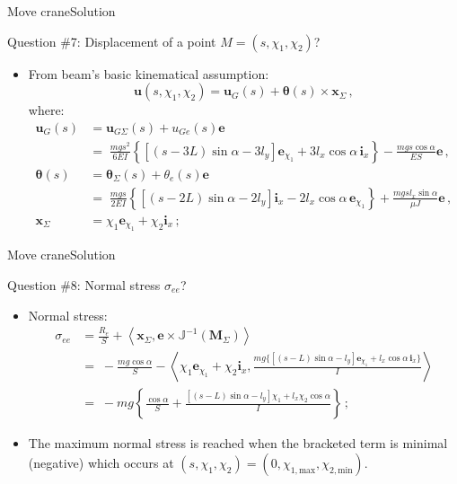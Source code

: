 \documentclass{beamer}
\newcommand{\uj}{u}
\newcommand{\xj}{x}
\newcommand{\yj}{y}
\newcommand{\uv}{{\boldsymbol\uj}}
\newcommand{\xv}{{\boldsymbol\xj}}
\newcommand{\ej}{e}
\renewcommand{\ij}{i}
\newcommand{\ev}{{\boldsymbol\ej}}
\newcommand{\iv}{{\boldsymbol\ij}}
\newcommand*{\xiu}{\chi_1}
\newcommand*{\xid}{\chi_2}
\newcommand*{\drotj}{\theta}
\newcommand*{\drot}{{\boldsymbol\drotj}}
\newcommand*{\Mstaticj}{J}
\newcommand*{\Mstatic}{{\mathbb\Mstaticj}}
\newcommand*{\stressj}{\sigma}
\newcommand{\Fresj}{R}
\newcommand{\Mresj}{M}
\newcommand{\Mres}{{\boldsymbol\Mresj}}
\newcommand{\scal}[1]{\left\langle{#1}\right\rangle}
\begin{document}
\begin{frame}{Move crane}{Solution}

\begin{exampleblock}{Question \#7: Displacement of a point $M=(s,\xiu,\xid)$?}
\begin{itemize}
\item From beam's basic kinematical assumption:
\begin{displaymath}
\uv(s,\xiu,\xid)=\uv_G(s)+\drot(s)\times\xv_\Sigma\,,
\end{displaymath}
where:
\begin{displaymath}
\begin{split}
\uv_G(s) &=\uv_{G\Sigma}(s)+\uj_{Ge}(s)\ev \\
&=\;\scriptstyle \frac{mgs^2}{6EI}\left\{\left[\left(s-3L\right)\sin\alpha-3l_\yj\right]\ev_{\xiu}+3l_\xj\cos\alpha\,\iv_\xj\right\} - \frac{mgs\cos\alpha}{ES}\ev \,, \\
\drot(s) &=\drot_\Sigma(s)+\drotj_e(s)\ev \\
&=\;\scriptstyle \frac{mgs}{2EI}\left\{\left[\left(s-2L\right)\sin\alpha-2l_\yj\right]\iv_\xj-2l_\xj\cos\alpha\,\ev_{\xiu}\right\} + \frac{mgsl_\xj\sin\alpha}{\mu J}\ev\,, \\
\xv_\Sigma &=\xiu\ev_{\xiu}+\xid\iv_\xj\,;
\end{split}
\end{displaymath}
\end{itemize}
\end{exampleblock}

\end{frame}

\begin{frame}{Move crane}{Solution}

\begin{exampleblock}{Question \#8: Normal stress $\stressj_{ee}$?}
\begin{itemize}
\item Normal stress:
\begin{displaymath}
\begin{split}
\stressj_{ee} &=\frac{\Fresj_e}{S}+\scal{\xv_\Sigma,\ev\times\Mstatic^{-1}(\Mres_\Sigma)} \\
&=\;\scriptstyle -\frac{mg\cos\alpha}{S}-\scal{\xiu\ev_{\xiu}+\xid\iv_\xj,\frac{mg\{[(s-L)\sin\alpha-l_\yj]\ev_{\xiu}+l_\xj\cos\alpha\,\iv_\xj\}}{I}} \\
&=\;\scriptstyle -mg\left\{\frac{\cos\alpha}{S}+\frac{[(s-L)\sin\alpha-l_\yj]\xiu+l_\xj\xid\cos\alpha}{I}\right\}\,;
\end{split}
\end{displaymath}
\item The maximum normal stress is reached when the bracketed term is minimal (negative) which occurs at $(s,\xiu,\xid)=(0,\chi_{1,\text{max}},\chi_{2,\text{min}})$.
\end{itemize}
\end{exampleblock}

\end{frame}
\end{document}
